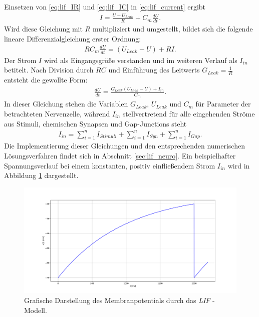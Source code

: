 	Einsetzen von \eqref{eq:lif_IR} und \eqref{eq:lif_IC} in \eqref{eq:lif_current} ergibt
	\begin{align}
		\label{eq:lif_I}
		I = \frac{U - U_{Leak}}{R} + C_m\frac{dU}{dt}\text{.}
	\end{align}
	Wird diese Gleichung mit $R$ multipliziert und umgestellt, bildet sich die folgende lineare Differenzialgleichung erster Ordnung:
	\begin{align}
		\label{eq:lif_nd}
		R C_m \frac{dU}{dt} = (U_{Leak} - U) + R I\text{.}
	\end{align}
	Der Strom $I$ wird als Eingangsgröße verstanden und im weiteren Verlauf als $I_{in}$ betitelt. Nach Division durch $RC$ und Einführung des Leitwerts $G_{Leak} = \tfrac{1}{R}$ entsteht die gewollte Form:
	\begin{align}
		\label{eq:lif}
		\frac{dU}{dt} = \frac{G_{Leak}(U_{Leak} - U) + I_{in}}{C_m}\text{.}
	\end{align}
	In dieser Gleichung stehen die Variablen $G_{Leak}$, $U_{Leak}$ und $C_m$ für Parameter der betrachteten Nervenzelle, während $I_{in}$ stellvertretend für alle eingehenden Ströme aus Stimuli, chemischen Synapsen und Gap-Junctions steht
	\begin{align}
		\label{eq:lif_current_in}
		I_{in} = \sum_{i = 1}^{n}{I_{Stimuli}} + \sum_{i = 1}^{n}{I_{Syn}} + \sum_{i = 1}^{n}{I_{Gap}}\text{.}
	\end{align}
	Die Implementierung dieser Gleichungen und den entsprechenden numerischen Lösungsverfahren findet sich in Abschnitt \ref{sec:lif_neuro}. Ein beispielhafter Spannungsverlauf bei einem konstanten, positiv einfließendem Strom $I_{in}$ wird in Abbildung \ref{fig:simple_lif} dargestellt.
	\begin{figure}[h]
		\centering
		\includegraphics[width=12cm]{figures/chap_lif/Simple_LIF.pdf}
		\caption{Grafische Darstellung des Membranpotentials durch das \textit{LIF} - Modell.}
		\label{fig:simple_lif}
	\end{figure}
